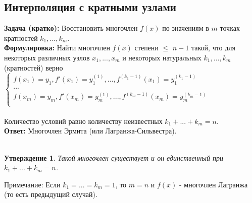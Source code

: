\documentclass[12pt]{article}
\newtheorem*{statement}{Утверждение}
\begin{document}
	\subsection{Интерполяция с кратными узлами}
	\textbf{Задача (кратко):}
	Восстановить многочлен $f(x)$ по значениям в $m$ точках кратностей $k_1,..., k_m$.\\
	\textbf{Формулировка:}
	Найти многочлен $f(x)$ степени $\leq$ $n-1$ такой, что для некоторых различных узлов $x_1,...,x_m$ и некоторых натуральных $k_1,...,k_m$ (кратностей) верно\\
	$  
	\left\{  
	\begin{array}{lcl}  
	f(x_1) = y_1, f'(x_1) = y_1^{(1)},...,f^{(k_1-1)}(x_1) = y_1^{(k_1-1)} \\  
	...\\
	f(x_m) = y_m, f'(x_m) = y_m^{(1)},...,f^{(k_m-1)}(x_m) = y_m^{(k_m-1)} \\
	\end{array}   
	\right.  
	$
	\\ \\
	Количество условий равно количеству неизвестных $k_1+...+k_m = n$.\\
	\textbf{Ответ:} Многочлен Эрмита (или Лагранжа-Сильвестра).\\
	\\
	\begin{statement}
	Такой многочлен существует и он единственный при $k_1+...+k_m = n$.
	\end{statement}
	Примечание: Если $k_1 = ... = k_m = 1$, то $m = n$ и $f(x)$ - многочлен Лагранжа (то есть предыдущий случай).\\
\end{document}
